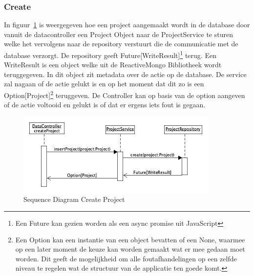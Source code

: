 \subsubsection*{Create}
In figuur~\ref{fig:seqdiagcreateProj} is weergegeven hoe een project aangemaakt wordt in de database door vanuit de datacontroller een Project Object naar de ProjectService te sturen welke het vervolgens naar de repository verstuurt die de communicatie met de database verzorgt. De repository geeft Future[WriteResult]\footnote{Een Future kan gezien worden als een async promise uit JavaScript} terug. Een WriteResult is een object welke uit de ReactiveMongo Bibliotheek wordt teruggegeven. In dit object zit metadata over de actie op de database. De service zal nagaan of de actie gelukt is en op het moment dat dit zo is een Option[Project]\footnote{Een Option kan een instantie van een object bevatten of een None, waarmee op een later moment de keuze kan worden gemaakt wat er mee gedaan moet worden. Dit geeft de mogelijkheid om alle foutafhandelingen op een zelfde niveau te regelen wat de structuur van de applicatie ten goede komt.} teruggeven. De Controller kan op basis van de option aangeven of de actie voltooid en gelukt is of dat er ergens iets fout is gegaan.
\begin{figure}[h]
    \myfloatalign
    \includegraphics[width=10cm]{gfx/umlet/exports/CRUD-CreateProject}
    \caption{Sequence Diagram Create Project }
    \label{fig:seqdiagcreateProj}
\end{figure}



